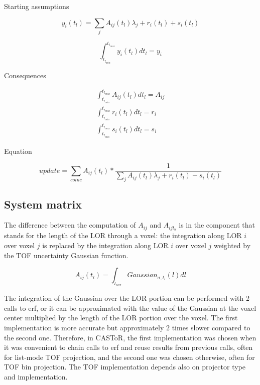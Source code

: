 \documentclass[a4paper, 11pt]{article}
\begin{document}
Starting assumptions

\begin{equation}
y_{i}(t_l) = \sum_j{A_{ij}(t_l)\lambda_j+r_{i}(t_l)+s_{i}(t_l)}
\end{equation}

\begin{equation}
\int_{t_{l_{min}}}^{t_{l_{max}}}{y_{i}(t_l)dt_l = y_i}
\end{equation}

Consequences

\begin{align}
\label{TOF_noTOF_list}
\int_{t_{l_{min}}}^{t_{l_{max}}}{A_{ij}(t_l)dt_l=A_{ij}}\\
\label{TOF_noTOF_random_list}
\int_{t_{l_{min}}}^{t_{l_{max}}}{r_{i}(t_l)dt_l=r_i}\\
\label{TOF_noTOF_scatter_list}
\int_{t_{l_{min}}}^{t_{l_{max}}}{s_{i}(t_l)dt_l=s_i}
\end{align}

Equation

\begin{equation}
update = \sum_{coinc}{A_{ij}(t_l)*\frac{1}{\sum_j{A_{ij}(t_l)\lambda_j+r_{i}(t_l)+s_{i}(t_l)}}}
\end{equation}

\subsection{System matrix}

The difference between the computation of $A_{ij}$ and $A_{ijt_b}$ is in the component that stands for the length of the LOR through a voxel: the integration along LOR $i$ over voxel $j$ is replaced by the integration along LOR $i$ over voxel $j$ weighted by the TOF uncertainty Gaussian function.

\begin{equation}
A_{ij}(t_l)=\int_{l_{vox}}{Gaussian_{\sigma,t_l}(l)dl}
\end{equation}

The integration of the Gaussian over the LOR portion can be performed with 2 calls to erf, or it can be approximated with the value of the Gaussian at the voxel center multiplied by the length of the LOR portion over the voxel. The first implementation is more accurate but approximately 2 times slower compared to the second one. Therefore, in CASToR, the first implementation was chosen when it was convenient to chain calls to erf and reuse results from previous calls, often for list-mode TOF projection, and the second one was chosen otherwise, often for TOF bin projection. The TOF implementation depends also on projector type and implementation.
\end{document}
